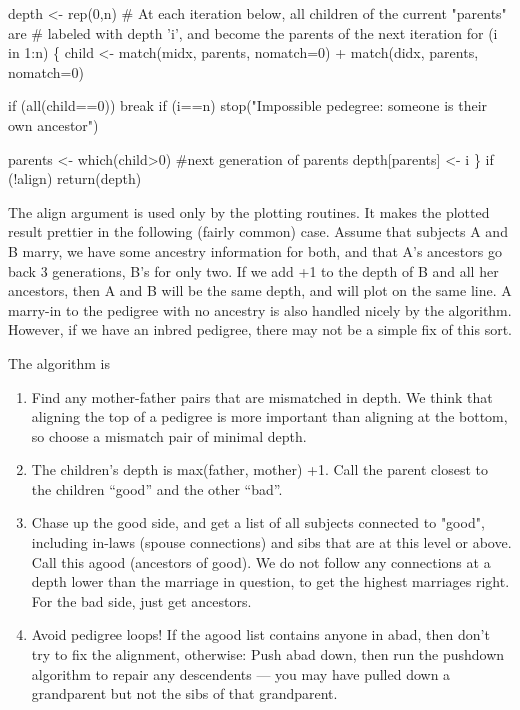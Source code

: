 \documentclass{article}
\begin{document}
\begin{enumerate}
    depth <- rep(0,n)
    # At each iteration below, all children of the current "parents" are
    #    labeled with depth 'i', and become the parents of the next iteration
    for (i in 1:n) \{
        child  <- match(midx, parents, nomatch=0) +
                  match(didx, parents, nomatch=0)

        if (all(child==0)) break
        if (i==n) 
            stop("Impossible pedegree: someone is their own ancestor")

        parents <- which(child>0) #next generation of parents
        depth[parents] <- i
        \}
    if (!align) return(depth)
\nwendcode{}\nwdocspar

The align argument is used only by the plotting routines.  
It makes the plotted result prettier in the following (fairly common)
case. 
Assume that subjects A and B marry, we have some ancestry information for
both, and that A's ancestors go back 3 generations, B's for only two.
If we add +1 to the depth of B and all her ancestors, then A and B
will be the same depth, and will plot on the same line.
A marry-in to the pedigree with no ancestry is also handled nicely
by the algorithm.
However, if we have an inbred pedigree, there may not be a simple fix
of this sort.

The algorithm is
\begin{enumerate}
  \item Find any mother-father pairs that are mismatched in depth.
    We think that aligning the top of a pedigree is more important
    than aligning at the bottom, so choose a mismatch pair of minimal
    depth.
  \item The children's depth is max(father, mother) +1.  Call the
    parent closest to the children ``good'' and the other ``bad''.
  \item  Chase up the good side, and get a list of all subjects connected
    to "good", including in-laws (spouse connections) and sibs that are
    at this level or above.  Call this agood (ancestors of good).
    We do not follow any connections at a depth lower than the 
    marriage in question, to get the highest marriages right.
    For the bad side, just get ancestors.
  \item Avoid pedigree loops!  If the agood list contains anyone in abad,
    then don't try to fix the alignment, otherwise:
    Push abad down, then run the pushdown algorithm to
    repair any descendents --- you may have pulled down a grandparent but
    not the sibs of that grandparent.
\end{enumerate}
    

\end{enumerate}
\end{document}
